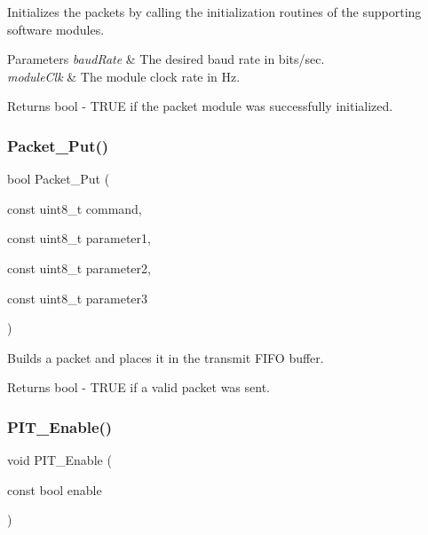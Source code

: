 Initializes the packets by calling the initialization routines of the supporting software modules. 


\begin{DoxyParams}{Parameters}
{\em baud\+Rate} & The desired baud rate in bits/sec. \\
\hline
{\em module\+Clk} & The module clock rate in Hz. \\
\hline
\end{DoxyParams}
\begin{DoxyReturn}{Returns}
bool -\/ T\+R\+UE if the packet module was successfully initialized. 
\end{DoxyReturn}
\mbox{\label{group__main__module_ga431a1e1da25a8214a502ec81f88fc3f1}} 
\subsubsection{\texorpdfstring{Packet\+\_\+\+Put()}{Packet\_Put()}}
{\footnotesize\ttfamily bool Packet\+\_\+\+Put (\begin{DoxyParamCaption}\item[{const uint8\+\_\+t}]{command,  }\item[{const uint8\+\_\+t}]{parameter1,  }\item[{const uint8\+\_\+t}]{parameter2,  }\item[{const uint8\+\_\+t}]{parameter3 }\end{DoxyParamCaption})}



Builds a packet and places it in the transmit F\+I\+FO buffer. 

\begin{DoxyReturn}{Returns}
bool -\/ T\+R\+UE if a valid packet was sent. 
\end{DoxyReturn}
\mbox{\label{group__main__module_gaed902f6158d6681e4b05d078575e4b09}} 
\subsubsection{\texorpdfstring{P\+I\+T\+\_\+\+Enable()}{PIT\_Enable()}}
{\footnotesize\ttfamily void P\+I\+T\+\_\+\+Enable (\begin{DoxyParamCaption}\item[{const bool}]{enable }\end{DoxyParamCaption})}



